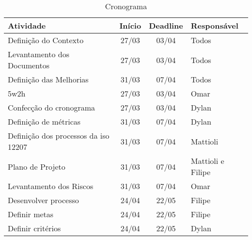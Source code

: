\begin{table}[]
\centering
\caption{Cronograma}
\label{cronograma}
\begin{tabular}{|l|c|c|l|}
\hline
\textbf{Atividade}                   & \multicolumn{1}{l|}{\textbf{Início}} & \multicolumn{1}{l|}{\textbf{Deadline}} & \textbf{Responsável} \\ \hline
Definição do Contexto                & 27/03                                & 03/04                                  & Todos                \\ \hline
Levantamento dos Documentos          & 27/03                                & 03/04                                  & Todos                \\ \hline
Definição das Melhorias              & 31/03                                & 07/04                                  & Todos                \\ \hline
5w2h                                 & 27/03                                & 03/04                                  & Omar                 \\ \hline
Confecção do cronograma              & 27/03                                & 03/04                                  & Dylan                \\ \hline
Definição de métricas                & 31/03                                & 07/04                                  & Dylan                \\ \hline
Definição dos processos da iso 12207 & 31/03                                & 07/04                                  & Mattioli             \\ \hline
Plano de Projeto                     & 31/03                                & 07/04                                  & Mattioli e Filipe    \\ \hline
Levantamento dos Riscos              & 31/03                                & 07/04                                  & Omar                 \\ \hline
Desenvolver processo                 & 24/04                                & 22/05                                  & Filipe               \\ \hline
Definir metas                        & 24/04                                & 22/05                                  & Filipe               \\ \hline
Definir critérios                    & 24/04                                & 22/05                                  & Dylan                \\ \hline
\end{tabular}
\end{table}